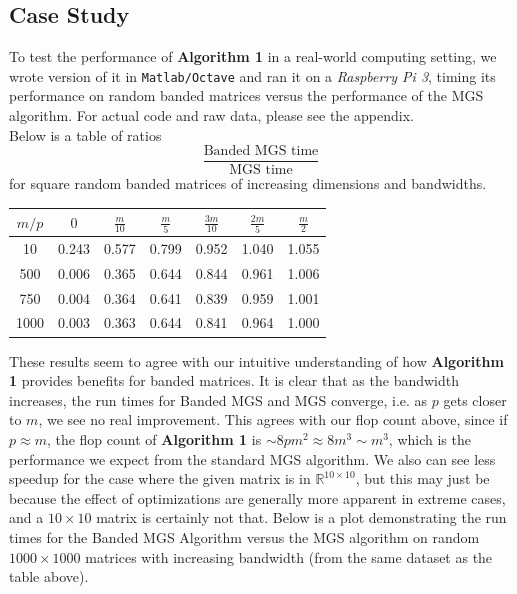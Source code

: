 \documentclass{article}
\numberwithin{pic}{section}
\numberwithin{lem}{section}
\numberwithin{thm}{section}
\numberwithin{cor}{section}
\theoremstyle{definition}
\numberwithin{ex}{section}
\numberwithin{defn}{section}
\theoremstyle{definition}
\theoremstyle{remark}
\newcommand{\R}{\ensuremath{\mathbb{R}}} %
\newcommand{\Frac}[2]{\displaystyle \frac{#1}{#2}}
\newlength\tindent
\renewcommand{\indent}{\hspace*{\tindent}}
\begin{document}
\subsection{Case Study}
\indent To test the performance of \textbf{Algorithm 1} in a real-world
computing setting, we wrote version of it in \texttt{Matlab/Octave} and ran it
on a \textit{Raspberry Pi 3}, timing its performance on random banded matrices versus
the performance of the MGS algorithm. For actual code and raw data, please see
the appendix.\\
\indent Below is a table of ratios 
\begin{equation*}
  \Frac{\text{Banded MGS time}}{\text{MGS time}}
\end{equation*}
for square random banded matrices of increasing dimensions and bandwidths.
\begin{center}
  \begin{tabular}{|| c || c | c | c | c | c | c ||}
    \hline
    $m / p$ & $0$ & $\frac{m}{10}$ & $\frac{m}{5}$ & $\frac{3m}{10}$ & $\frac{2m}{5}$ & $\frac{m}{2}$\\
    \hline\hline
    10 & 0.243 & 0.577 & 0.799 & 0.952 & 1.040 & 1.055\\
    \hline
    500 & 0.006 & 0.365 & 0.644 & 0.844 & 0.961 & 1.006\\
    \hline
750 & 0.004 & 0.364 & 0.641 & 0.839 & 0.959 & 1.001\\
    \hline
1000 & 0.003 & 0.363 & 0.644 & 0.841 & 0.964 & 1.000\\
    \hline
  \end{tabular}
\end{center}
\indent These results seem to agree with our intuitive understanding of how
\textbf{Algorithm 1} provides benefits for banded matrices. It is clear that as
the bandwidth increases, the run times for Banded MGS and MGS converge, i.e. as
$p$ gets closer to $m$, we see no real improvement. This agrees with our flop
count above, since if $p\approx m$, the flop count of \textbf{Algorithm 1} is
$\sim 8pm^2\approx 8m^3\sim m^3$, which is the performance we expect from the standard
MGS algorithm. We also can see less speedup for the case where the given matrix
is in $\R^{10\times 10}$, but this may just be because the effect of optimizations are
generally more apparent in extreme cases, and a $10\times 10$ matrix is
certainly not that.
\indent Below is a plot demonstrating the run times for the Banded
MGS Algorithm versus the MGS algorithm on random $1000\times 1000$ matrices with
increasing bandwidth (from the same dataset as the table above).
\end{document}
